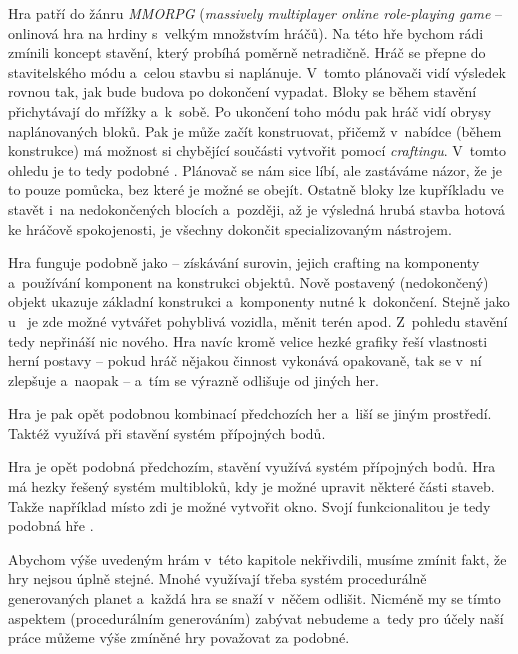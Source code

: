 Hra \NI{} patří do žánru \textit{MMORPG} (\textit{massively multiplayer online role-playing game} -- onlinová hra na hrdiny s~velkým množstvím hráčů). Na této hře bychom rádi zmínili koncept stavění, který probíhá poměrně netradičně. Hráč se přepne do stavitelského módu a~celou stavbu si naplánuje. V~tomto plánovači vidí výsledek rovnou tak, jak bude budova po dokončení vypadat. Bloky se během stavění přichytávají do mřížky a~k~sobě. Po ukončení toho módu pak hráč vidí obrysy naplánovaných bloků. Pak je může začít konstruovat, přičemž v~nabídce (během konstrukce) má možnost si chybějící součásti vytvořit pomocí \textit{craftingu}. V~tomto ohledu je to tedy podobné \SE{}. Plánovač se nám sice líbí, ale zastáváme názor, že je to pouze pomůcka, bez které je možné se obejít. Ostatně bloky lze kupříkladu ve \SE{} stavět i~na nedokončených blocích a~později, až je výsledná hrubá stavba hotová ke hráčově spokojenosti, je všechny dokončit specializovaným nástrojem.


Hra \PN{} funguje podobně jako \SE{} -- získávání surovin, jejich crafting na komponenty a~používání komponent na konstrukci objektů. Nově postavený (nedokončený) objekt ukazuje základní konstrukci a~komponenty nutné k~dokončení. Stejně jako u~\SE{} je zde možné vytvářet pohyblivá vozidla, měnit terén apod. Z~pohledu stavění tedy nepřináší nic nového. Hra navíc kromě velice hezké grafiky řeší vlastnosti herní postavy -- pokud hráč nějakou činnost vykonává opakovaně, tak se v~ní zlepšuje a~naopak -- a~tím se výrazně odlišuje od jiných her.


Hra \ARK{} je pak opět podobnou kombinací předchozích her a~liší se jiným prostředí. Taktéž využívá při stavění systém přípojných bodů.

Hra \NMS{} je opět podobná předchozím, stavění využívá systém přípojných bodů. Hra má hezky řešený systém multibloků, kdy je možné upravit některé části staveb. Takže například místo zdi je možné vytvořit okno. Svojí funkcionalitou je tedy podobná hře \SE{}.

Abychom výše uvedeným hrám v~této kapitole nekřivdili, musíme zmínit fakt, že hry nejsou úplně stejné. Mnohé využívají třeba systém procedurálně generovaných planet a~každá hra se snaží v~něčem odlišit. Nicméně my se tímto aspektem (procedurálním generováním) zabývat nebudeme a~tedy pro účely naší práce můžeme výše zmíněné hry považovat za podobné.

